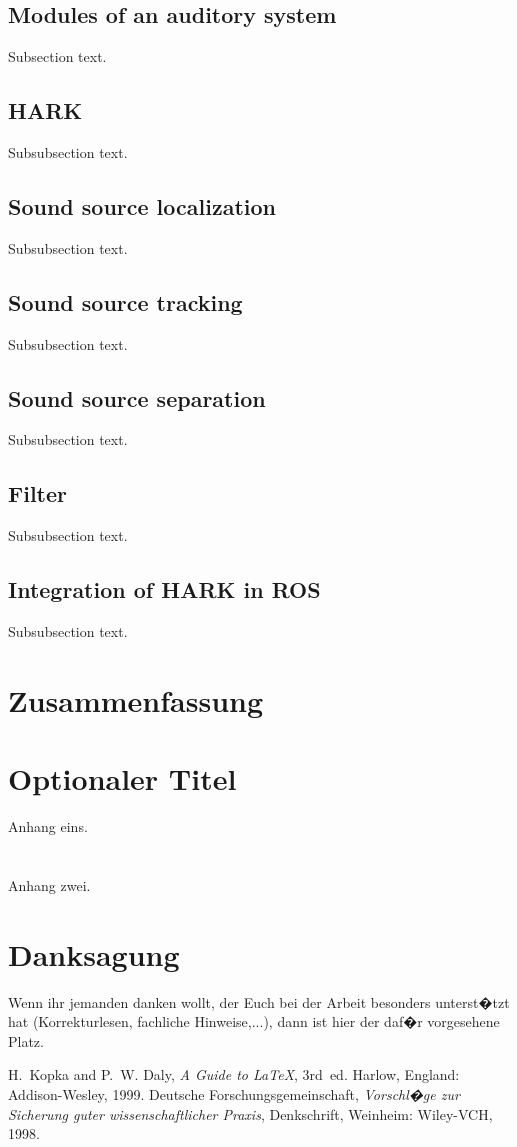 \documentclass[journal,final,a4paper,twoside]{PS}
\begin{document}
\subsection{Modules of an auditory system}
Subsection text.

\subsection{HARK}
Subsubsection text.

\subsection{Sound source localization}
Subsubsection text.

\subsection{Sound source tracking}
Subsubsection text.

\subsection{Sound source separation}
Subsubsection text.

\subsection{Filter}
Subsubsection text.

\subsection{Integration of HARK in ROS}
Subsubsection text.


\section{Zusammenfassung}
\label{sec:zus}


\appendices
\section{Optionaler Titel}
Anhang eins.
\section{}
Anhang zwei.



\section*{Danksagung}
Wenn ihr jemanden danken wollt, der Euch bei der Arbeit besonders
unterst�tzt hat (Korrekturlesen, fachliche Hinweise,...), dann ist hier der daf�r vorgesehene Platz.

\begin{thebibliography}{1}
H.~Kopka and P.~W. Daly, \emph{A Guide to {\LaTeX}}, 3rd~ed. Harlow, England: Addison-Wesley, 1999.
Deutsche Forschungsgemeinschaft, \emph{Vorschl�ge zur Sicherung guter wissenschaftlicher Praxis}, Denkschrift, Weinheim: Wiley-VCH, 1998.
\end{thebibliography}
\end{document}
